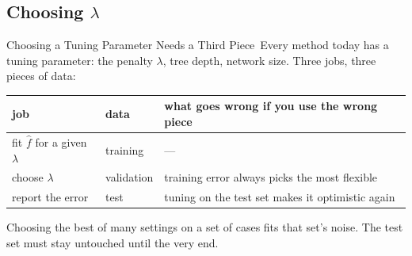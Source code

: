 \documentclass[aspectratio=169,11pt,xcolor=dvipsnames]{beamer}
\newcommand{\core}{\,\raisebox{0.6pt}{\textcolor{corestar}{$\bigstar$}}}
\begin{document}
\subsection{Choosing $\lambda$}

\begin{frame}{Choosing a Tuning Parameter Needs a Third Piece\core}
Every method today has a tuning parameter: the penalty $\lambda$, tree depth, network size. Three jobs,
three pieces of data:
\vskip4pt
\begin{center}
\end{center}
\begin{center}\small
\renewcommand{\arraystretch}{1.1}
\begin{tabular}{@{}lll@{}}
\toprule
job & data & what goes wrong if you use the wrong piece \\
\midrule
fit $\hat f$ for a given $\lambda$ & training & --- \\
choose $\lambda$ & validation & training error always picks the most flexible \\
report the error & test & tuning on the test set makes it optimistic again \\
\bottomrule
\end{tabular}
\end{center}
\vskip2pt
{\small Choosing the best of many settings on a set of cases fits that set's noise. The
test set must stay untouched until the very end.}
\end{frame}
\end{document}
